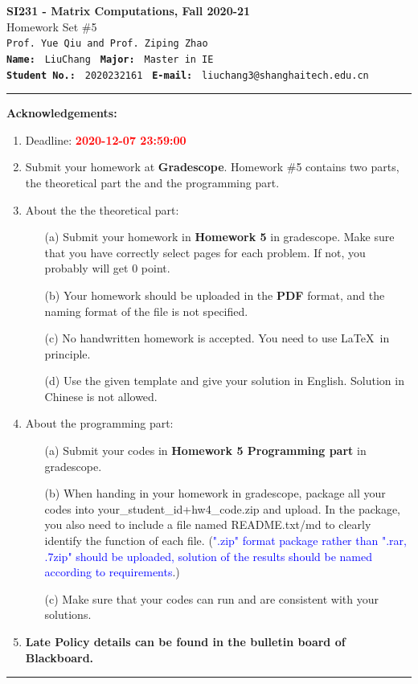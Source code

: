 \documentclass[english,onecolumn]{IEEEtran}
\begin{document}
\begin{center}
	\textbf{\LARGE{SI231 - Matrix Computations, Fall 2020-21}}\\
	{\Large Homework Set \#5}\\
	\texttt{Prof. Yue Qiu and Prof. Ziping Zhao}\\
	\texttt{\textbf{Name:}}   	\texttt{ LiuChang }  		\hspace{1bp}
	\texttt{\textbf{Major:}}  	\texttt{ Master in IE } 	\\
	\texttt{\textbf{Student No.:}} 	\texttt{ 2020232161 }     \hspace{1bp}
	\texttt{\textbf{E-mail:}} 	\texttt{ liuchang3@shanghaitech.edu.cn}
\par\end{center}

\noindent
\rule{\linewidth}{0.4pt}
{\bf {\large Acknowledgements:}}
\begin{enumerate}
    \item Deadline: \textcolor{red}{\textbf{2020-12-07 23:59:00}}
    \item Submit your homework at \textbf{Gradescope}.
    Homework \#5 contains two parts, the theoretical part the and the programming part.
    \item About the the theoretical part:
    \begin{enumerate}
            \item[(a)] Submit your homework in \textbf{Homework 5} in gradescope. Make sure that you have correctly select pages for each problem. If not, you probably will get 0 point.
            \item[(b)] Your homework should be uploaded in the \textbf{PDF} format, and the naming format of the file is not specified.
            \item[(c)] No handwritten homework is accepted. You need to use \LaTeX $\,$ in principle.
            \item[(d)] Use the given template and give your solution in English. Solution in Chinese is not allowed. 
        \end{enumerate}
  \item About the programming part:
  \begin{enumerate}
      \item[(a)] Submit your codes in \textbf{Homework 5 Programming part} in gradescope. 
      \item[(b)] When handing in your homework in gradescope, package all your codes into {\sf your\_student\_id+hw4\_code.zip} and upload. In the package, you also need to include a file named {\sf README.txt/md} to clearly identify the function of each file. (\textcolor{blue}{".zip" format package rather than ".rar, .7zip" should be uploaded, solution of the results should be named according to requirements}.)
     \item[(c)] Make sure that your codes can run and are consistent with your solutions.
  \end{enumerate}
  \item \textbf{Late Policy details can be found in the bulletin board of Blackboard.}
\end{enumerate}
\rule{\linewidth}{0.4pt}
\end{document}
